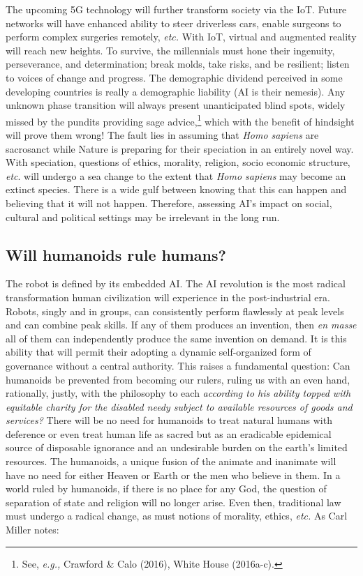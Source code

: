 \begin{multicols}{2}
The upcoming 5G technology will further transform society via the IoT. Future networks will have enhanced ability to steer driverless cars, enable surgeons to perform complex surgeries remotely, \textit{etc.} With IoT, virtual and augmented reality will reach new heights. To survive, the millennials must hone their ingenuity, perseverance, and determination; break molds, take risks, and be resilient; listen to voices of change and progress. The demographic dividend perceived in some developing countries is really a demographic liability (AI is their nemesis). Any unknown phase transition will always present unanticipated blind spots, widely missed by the pundits providing sage advice,\footnote{See, \textit{e.g.,} Crawford \& Calo (2016), White House (2016a-c).}  which with the benefit of hindsight will prove them wrong! The fault lies in assuming that \textit{Homo sapiens} are sacrosanct while Nature is preparing for their speciation in an entirely novel way. With speciation, questions of ethics, morality, religion, socio economic structure, \textit{etc}. will undergo a sea change to the extent that \textit{Homo sapiens} may become an extinct species. There is a wide gulf between knowing that this can happen and believing that it will not happen. Therefore, assessing AI's impact on social, cultural and political settings may be irrelevant in the long run.

\subsection{Will humanoids rule humans?}

The robot is defined by its embedded AI. The AI revolution is the most radical transformation human civilization will experience in the post-industrial era. Robots, singly and in groups, can consistently perform flawlessly at peak levels and can combine peak skills. If any of them produces an invention, then \textit{en masse} all of them can independently produce the same invention on demand. It is this ability that will permit their adopting a dynamic self-organized form of governance without a central authority. This raises a fundamental question: Can humanoids be prevented from becoming our rulers, ruling us with an even hand, rationally, justly, with the philosophy to each \textit{according to his ability topped with equitable charity for the disabled needy subject to available resources of goods and services?} There will be no need for humanoids to treat natural humans with deference or even treat human life as sacred but as an eradicable epidemical source of disposable ignorance and an undesirable burden on the earth's limited resources. The humanoids, a unique fusion of the animate and inanimate will have no need for either Heaven or Earth or the men who believe in them. In a world ruled by humanoids, if there is no place for any God, the question of separation of state and religion will no longer arise. Even then, traditional law must undergo a radical change, as must notions of morality, ethics, \textit{etc.} As Carl Miller notes:


\end{multicols}
